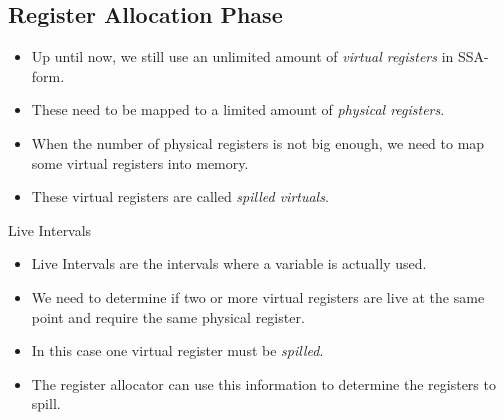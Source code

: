 \documentclass[]{beamer}
\begin{document}
\subsection{Register Allocation Phase}
\begin{frame}{}

\begin{itemize}
  \item Up until now, we still use an unlimited amount of \textit{virtual registers} in SSA-form.
  \item These need to be mapped to a limited amount of \textit{physical registers}.
  \item When the number of physical registers is not big enough, we need to map some 
        virtual registers into memory. 
  \item These virtual registers are called \textit{spilled virtuals}.
\end{itemize}

\end{frame}

\begin{frame}{Live Intervals}

\begin{itemize}
  \item Live Intervals are the intervals where a variable is actually used.
  \item We need to determine if two or more virtual registers are live at the same point and require the same physical register.
  \item In this case one virtual register must be \textit{spilled}.
  \item The register allocator can use this information to determine the registers to spill.
\end{itemize}

\end{frame}

\end{document}
